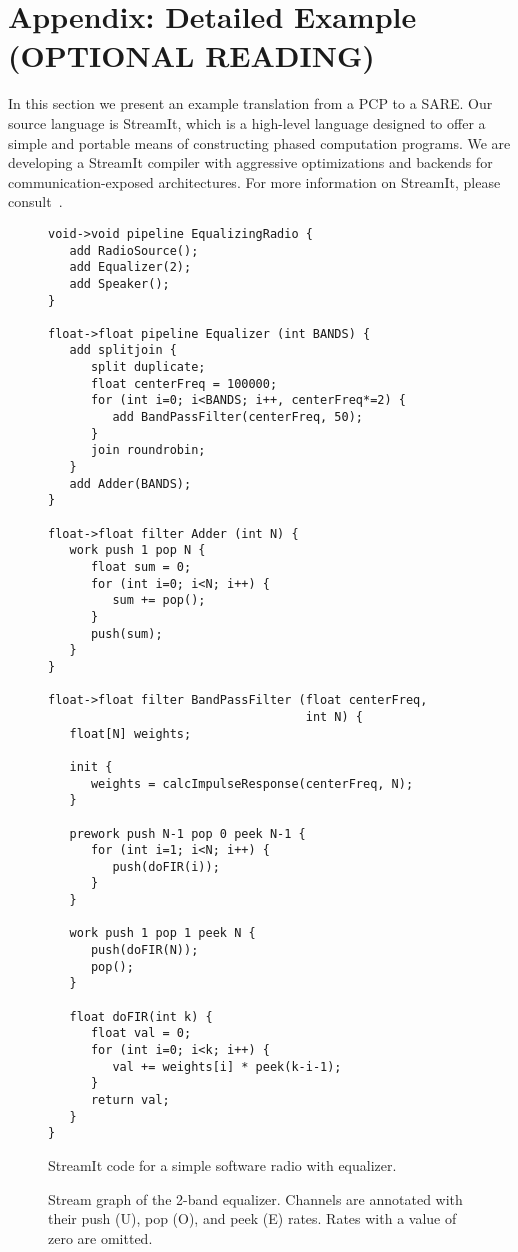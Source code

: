\section{Appendix: Detailed Example (OPTIONAL READING)}

In this section we present an example translation from a PCP to a
SARE.  Our source language is StreamIt, which is a high-level language
designed to offer a simple and portable means of constructing phased
computation programs.  We are developing a StreamIt compiler with
aggressive optimizations and backends for communication-exposed
architectures.  For more information on StreamIt, please
consult~\cite{streamitcc,Gordo02}.

\begin{figure}[t]
\scriptsize
\begin{minipage}{3in}
\begin{verbatim}
void->void pipeline EqualizingRadio {
   add RadioSource();
   add Equalizer(2);
   add Speaker();
}

float->float pipeline Equalizer (int BANDS) {
   add splitjoin {
      split duplicate;
      float centerFreq = 100000;
      for (int i=0; i<BANDS; i++, centerFreq*=2) {
         add BandPassFilter(centerFreq, 50);
      }
      join roundrobin;
   }
   add Adder(BANDS);
}

float->float filter Adder (int N) {
   work push 1 pop N {
      float sum = 0;
      for (int i=0; i<N; i++) {
         sum += pop();
      }
      push(sum);
   }
}

float->float filter BandPassFilter (float centerFreq, 
                                    int N) {
   float[N] weights;

   init {
      weights = calcImpulseResponse(centerFreq, N);
   }

   prework push N-1 pop 0 peek N-1 {
      for (int i=1; i<N; i++) {
         push(doFIR(i));
      }
   }

   work push 1 pop 1 peek N {
      push(doFIR(N));
      pop();
   }

   float doFIR(int k) {
      float val = 0;
      for (int i=0; i<k; i++) {
         val += weights[i] * peek(k-i-1);
      }
      return val;
   }
}
\end{verbatim}
\vspace{-6pt}
\parbox{2.7in}{\caption{StreamIt code for a simple software radio with equalizer.
\protect\label{fig:eq-code}}}
\end{minipage}
\hspace{0.3in}
\begin{minipage}{3.2in}
\vspace{12pt}
\caption{Stream graph of the 2-band equalizer.  Channels are annotated
with their push (U), pop (O), and peek (E) rates.  Rates with a value
of zero are omitted. \protect\label{fig:eq-graph}}
\end{minipage}
\end{figure}

